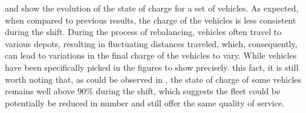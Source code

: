  and  show the evolution of the state of charge for a set of vehicles. As expected, when compared to previous results, the charge of the vehicles is less consistent during the shift. During the process of rebalancing, vehicles often travel to various depots, resulting in fluctuating distances traveled, which, consequently, can lead to variations in the final charge of the vehicles to vary. While vehicles have been specifically picked in the figures to show precisely. this fact, it is still worth noting that, as could be observed in , the state of charge of some vehicles remains well above 90\% during the shift, which suggests the fleet could be potentially be reduced in number and still offer the same quality of service. \\


